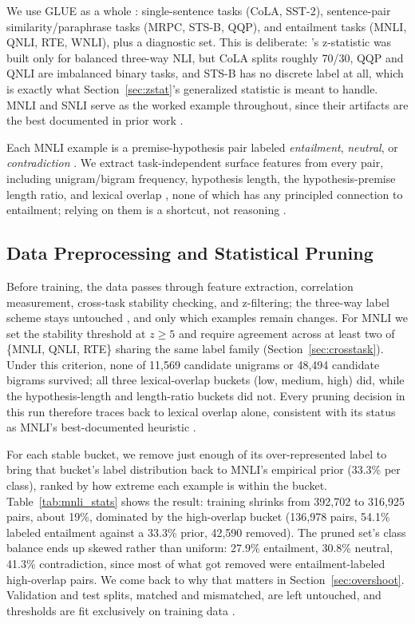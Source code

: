 \documentclass[conference]{IEEEtran}
\begin{document}
We use GLUE as a whole \cite{wang2018glue}: single-sentence tasks (CoLA, SST-2), sentence-pair similarity/paraphrase tasks (MRPC, STS-B, QQP), and entailment tasks (MNLI, QNLI, RTE, WNLI), plus a diagnostic set. This is deliberate: \cite{wu2022generating}'s z-statistic was built only for balanced three-way NLI, but CoLA splits roughly 70/30, QQP and QNLI are imbalanced binary tasks, and STS-B has no discrete label at all, which is exactly what Section~\ref{sec:zstat}'s generalized statistic is meant to handle. MNLI \cite{williams2018broad} and SNLI \cite{bowman2015large} serve as the worked example throughout, since their artifacts are the best documented in prior work \cite{wu2022generating, gururangan2018annotation}.

Each MNLI example is a premise-hypothesis pair labeled \textit{entailment}, \textit{neutral}, or \textit{contradiction} \cite{williams2018broad}. We extract task-independent surface features from every pair, including unigram/bigram frequency, hypothesis length, the hypothesis-premise length ratio, and lexical overlap \cite{wu2022generating}, none of which has any principled connection to entailment; relying on them is a shortcut, not reasoning \cite{poliak2018hypothesis, mccoy2019right}.

\subsection{Data Preprocessing and Statistical Pruning}

Before training, the data passes through feature extraction, correlation measurement, cross-task stability checking, and z-filtering; the three-way label scheme stays untouched \cite{williams2018broad}, and only which examples remain changes. For MNLI we set the stability threshold at $z \geq 5$ and require agreement across at least two of \{MNLI, QNLI, RTE\} sharing the same label family (Section~\ref{sec:crosstask}). Under this criterion, none of 11{,}569 candidate unigrams or 48{,}494 candidate bigrams survived; all three lexical-overlap buckets (low, medium, high) did, while the hypothesis-length and length-ratio buckets did not. Every pruning decision in this run therefore traces back to lexical overlap alone, consistent with its status as MNLI's best-documented heuristic \cite{mccoy2019right}.

For each stable bucket, we remove just enough of its over-represented label to bring that bucket's label distribution back to MNLI's empirical prior (33.3\% per class), ranked by how extreme each example is within the bucket. Table~\ref{tab:mnli_stats} shows the result: training shrinks from 392{,}702 to 316{,}925 pairs, about 19\%, dominated by the high-overlap bucket (136{,}978 pairs, 54.1\% labeled entailment against a 33.3\% prior, 42{,}590 removed). The pruned set's class balance ends up skewed rather than uniform: 27.9\% entailment, 30.8\% neutral, 41.3\% contradiction, since most of what got removed were entailment-labeled high-overlap pairs. We come back to why that matters in Section~\ref{sec:overshoot}. Validation and test splits, matched and mismatched, are left untouched, and thresholds are fit exclusively on training data \cite{wang2018glue, wu2022generating}.
\end{document}
